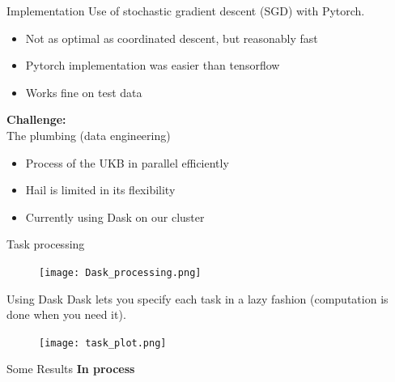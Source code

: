 \documentclass{beamer}
\begin{document}
\begin{frame}[t]{Implementation}
  Use of stochastic gradient descent (SGD) with Pytorch.
  \begin{itemize}
    \item Not as optimal as coordinated descent, but reasonably fast
    \item Pytorch implementation was easier than tensorflow
    \item Works fine on test data
  \end{itemize}
  \textbf{Challenge:} \\
  The plumbing (data engineering)
  \\
  \begin{itemize}
    \item Process of the UKB in parallel efficiently
    \item Hail is limited in its flexibility
    \item Currently using Dask on our cluster
  \end{itemize}
\end{frame}

\begin{frame}[t]{Task processing}
  \begin{figure}[htpb]
    \centering
    \texttt{[image: Dask\_processing.png]}
  \end{figure} 
\end{frame}

\begin{frame}[t]{Using Dask}
  Dask lets you specify each task in a lazy fashion (computation is done when you need it).
  \begin{figure}[htpb]
    \centering
    \texttt{[image: task\_plot.png]}
  \end{figure} 
\end{frame}

\begin{frame}[t]{Some Results}
 \textbf{In process}  
\end{frame}
\end{document}
